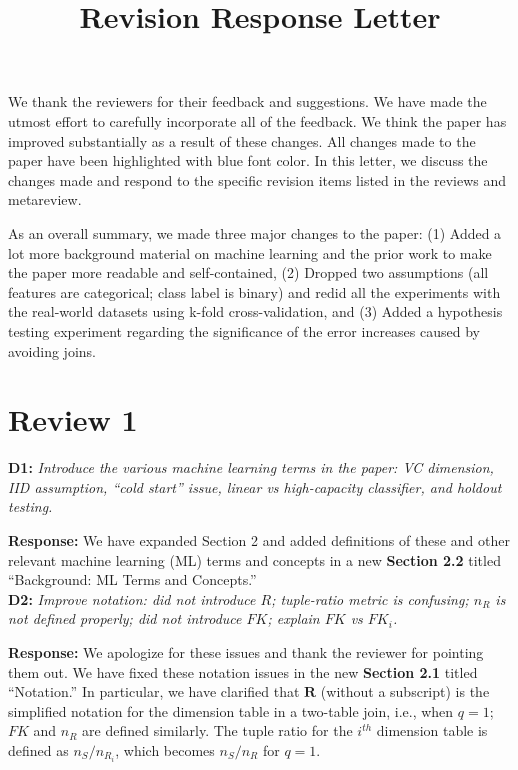 \documentclass[preprint]{vldb}
\title{Revision Response Letter}
\author{}
\begin{document}
\maketitle

We thank the reviewers for their feedback and suggestions. We have made the utmost effort to carefully incorporate all of the feedback. 
We think the paper has improved substantially as a result of these changes. All changes made to the paper have been highlighted with blue font color.
In this letter, we discuss the changes made and respond to the specific revision items listed in the reviews and metareview. 

As an overall summary, we made three major changes to the paper: (1) Added a lot more background material on machine learning and the prior work to make the 
paper more readable and self-contained, (2) Dropped two assumptions (all features are categorical; class label is binary) and redid all the experiments with the 
real-world datasets using k-fold cross-validation, and (3) Added a hypothesis testing experiment regarding the significance of the error increases caused by avoiding joins.

\section{Review 1}

\vspace{2mm}
\noindent \textbf{D1:} \textit{Introduce the various machine learning terms in the paper: VC dimension, IID assumption, ``cold start'' issue, linear vs high-capacity classifier, and holdout testing.}

\vspace{2mm}
\noindent \textbf{Response:} We have expanded Section 2 and added definitions of these and other relevant machine learning (ML) terms and concepts in a new 
\textbf{Section 2.2} titled ``Background: ML Terms and Concepts.''\\

\noindent \textbf{D2:} \textit{Improve notation: did not introduce $R$; tuple-ratio metric is confusing; $n_R$ is not defined properly; did not introduce $FK$; explain $FK$ vs $FK_i$.}

\vspace{2mm}
\noindent \textbf{Response:} We apologize for these issues and thank the reviewer for pointing them out. We have fixed these notation issues in the new 
\textbf{Section 2.1} titled ``Notation.'' In particular, we have clarified that $\textbf{R}$ (without a subscript) is the simplified notation for the dimension 
table in a two-table join, i.e., when $q=1$; $\mathit{FK}$ and $n_R$ are defined similarly. The tuple ratio for the $i^{\mathit{th}}$ dimension table is defined 
as $n_S / n_{R_i}$, which becomes $n_S / n_R$ for $q=1$.\\
\end{document}
